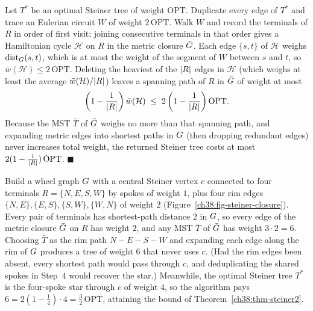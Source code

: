 \begin{whybox}
Let $T^\ast$ be an optimal Steiner tree of weight $\mathrm{OPT}$. Duplicate every edge of $T^\ast$ and
trace an Eulerian circuit $W$ of weight $2\,\mathrm{OPT}$. Walk $W$ and record the terminals of $R$ in
order of first visit; joining consecutive terminals in that order gives a Hamiltonian cycle $\mathcal{H}$
on $R$ in the metric closure $\bar{G}$. Each edge $\{s,t\}$ of $\mathcal{H}$ weighs $\operatorname{dist}_G(s,t)$,
which is at most the weight of the segment of $W$ between $s$ and $t$, so $\bar w(\mathcal{H})\le 2\,\mathrm{OPT}$.
Deleting the heaviest of the $\lvert R\rvert$ edges in $\mathcal{H}$ (which weighs at least the average
$\bar w(\mathcal{H})/\lvert R\rvert$) leaves a spanning path of $R$ in $\bar{G}$ of weight at most
\[
  \left(1 - \frac{1}{\lvert R\rvert}\right)\bar w(\mathcal{H}) \;\le\; 2\left(1 - \frac{1}{\lvert R\rvert}\right)\mathrm{OPT}.
\]
Because the MST $\bar T$ of $\bar{G}$ weighs no more than that spanning path, and expanding metric edges
into shortest paths in $G$ (then dropping redundant edges) never increases total weight, the returned
Steiner tree costs at most $2(1-\tfrac{1}{\lvert R\rvert})\,\mathrm{OPT}$. $\blacksquare$
\end{whybox}

\begin{labbox}
Build a wheel graph $G$ with a central Steiner vertex $c$ connected to four terminals $R=\{N,E,S,W\}$
by spokes of weight $1$, plus four rim edges $\{N,E\},\{E,S\},\{S,W\},\{W,N\}$ of weight $2$
(Figure~\ref{ch38:fig-steiner-closure}). Every pair of terminals has shortest-path distance $2$ in $G$,
so every edge of the metric closure $\bar{G}$ on $R$ has weight $2$, and any MST $\bar T$ of $\bar{G}$
has weight $3\cdot 2 = 6$. Choosing $\bar T$ as the rim path $N\!-\!E\!-\!S\!-\!W$ and expanding each edge
along the rim of $G$ produces a tree of weight $6$ that never uses $c$. (Had the rim edges been absent,
every shortest path would pass through $c$, and deduplicating the shared spokes in Step~4 would recover
the star.) Meanwhile, the optimal Steiner tree $T^\ast$ is the four-spoke star through $c$ of weight $4$,
so the algorithm pays $6 = 2(1-\tfrac{1}{4})\cdot 4 = \tfrac{3}{2}\,\mathrm{OPT}$, attaining the bound of
Theorem~\ref{ch38:thm-steiner2}.
\end{labbox}

